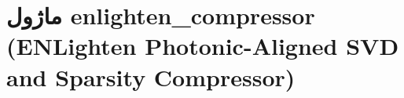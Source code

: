 \section{ماژول enlighten\_compressor (ENLighten Photonic-Aligned SVD and Sparsity Compressor)}
\label{sec:module_enlighten_compressor}
